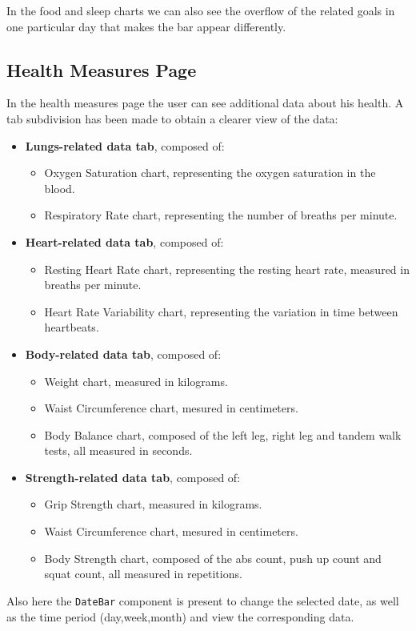 \noindent In the food and sleep charts we can also see the overflow of the related goals in one particular day that makes the bar appear differently.

\subsection{Health Measures Page}
In the health measures page the user can see additional data about his health. \newline A tab subdivision has been made to obtain a clearer view of the data:
\begin{itemize}[nosep] %
    \item \textbf{Lungs-related data tab}, composed of:
    \begin{itemize}[nosep]
        \item Oxygen Saturation chart, representing the oxygen saturation in the blood.
        \item Respiratory Rate chart, representing the number of breaths per minute.
    \end{itemize}
    \item \textbf{Heart-related data tab}, composed of:
    \begin{itemize}[nosep]
        \item Resting Heart Rate chart, representing the resting heart rate, measured in breaths per minute.
        \item Heart Rate Variability chart, representing the variation in time between heartbeats.
    \end{itemize}
    \item \textbf{Body-related data tab}, composed of:
    \begin{itemize}[nosep]
        \item Weight chart, measured in kilograms.
        \item Waist Circumference chart, mesured in centimeters.
        \item Body Balance chart, composed of the left leg, right leg and tandem walk tests, all measured in seconds.
    \end{itemize}
    \item \textbf{Strength-related data tab}, composed of:
    \begin{itemize}[nosep]
        \item Grip Strength chart, measured in kilograms.
        \item Waist Circumference chart, mesured in centimeters.
        \item Body Strength chart, composed of the abs count, push up count and squat count, all measured in repetitions.
    \end{itemize}
\end{itemize}
Also here the \texttt{DateBar} component is present to change the selected date, as well as the time period (day,week,month) and view the corresponding data.
